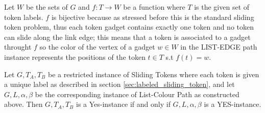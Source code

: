 Let $W$ be the sets of $G$ and $f: T \rightarrow W$ be a function where $T$ is the given set of token labels. $f$ is bijective because
as stressed before this is the standard sliding token problem, thus each token gadget contains exactly one token and no token can slide
along the link edge; this means that a token is associated to a gadget throught $f$ so the color of the vertex of a gadget
$w \in W$ in the LIST-EDGE path instance represents the positions of the token $t \in T$ s.t $f(t) = w$.


\begin{claim} Let $G, T_A, T_B$ be a restricted instance of Sliding Tokens where each token is given a unique label as described in
section \ref{sec:labeled_sliding_token}, and let $G , L, \alpha, \beta$ be the corresponding instance of List-Colour Path as constructed above.
Then $G, T_A, T_B$ is a Yes-instance if and only if $G , L, \alpha, \beta$ is a YES-instance.
\end{claim}

